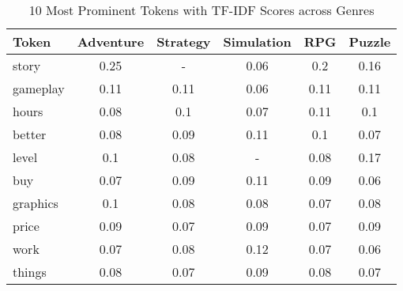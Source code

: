 \begin{table}[h]
    \centering
    \begin{tabular}{l|c|c|c|c|c}
        Token & Adventure & Strategy & Simulation & RPG & Puzzle \\
        \hline
        story & 0.25 & - & 0.06 & 0.2 & 0.16 \\
        gameplay & 0.11 & 0.11 & 0.06 & 0.11 & 0.11 \\
        hours & 0.08 & 0.1 & 0.07 & 0.11 & 0.1 \\
        better & 0.08 & 0.09 & 0.11 & 0.1 & 0.07 \\
        level & 0.1 & 0.08 & - & 0.08 & 0.17 \\
        buy & 0.07 & 0.09 & 0.11 & 0.09 & 0.06 \\
        graphics & 0.1 & 0.08 & 0.08 & 0.07 & 0.08 \\
        price & 0.09 & 0.07 & 0.09 & 0.07 & 0.09 \\
        work & 0.07 & 0.08 & 0.12 & 0.07 & 0.06 \\
        things & 0.08 & 0.07 & 0.09 & 0.08 & 0.07
    \end{tabular}
    \caption{10 Most Prominent Tokens with TF-IDF Scores across Genres}
    \label{tab:top_tokens_by_genre}
\end{table}